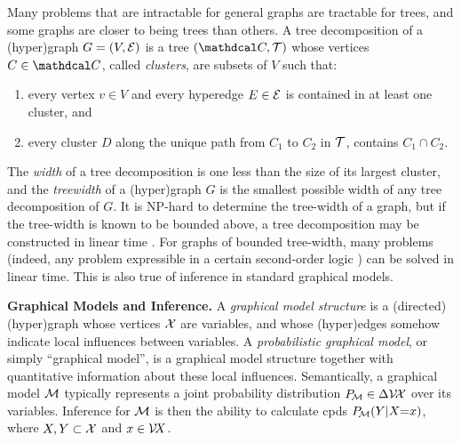 Many problems that are intractable for general graphs
are tractable for trees, and
some graphs are closer to being trees than others.
A tree decomposition of a (hyper)graph $G = (V, \Ed)$ is a tree $(\C, \mathcal T)$ whose vertices $C \in \C$, called
\emph{clusters}, are subsets of $V$ such that:

\begin{enumerate}[nosep]
    \item every vertex $v \in V$ and every hyperedge $E \in \Ed$ is contained in at least one cluster, and
        \item every cluster $D$ along the unique path from $C_1$ to $C_2$ in $\cal T$,
         contains $C_1 \cap C_2$.
\end{enumerate}

The \emph{width} of a tree decomposition is one less than the size of its largest cluster,
and the \emph{treewidth} of a (hyper)graph $G$ is the smallest possible width of any tree decomposition of $G$.
It is NP-hard to determine the tree-width of a graph, but
if the tree-width is known to be bounded above, a tree decomposition may be constructed in linear time \parencite{bodlaender1993linear}.
For graphs of bounded tree-width, many problems 
(indeed, any problem expressible in a certain second-order logic \parencite{courcelle1990})
can be solved in
linear time.
This is also true of inference in 
standard graphical models.


\textbf{Graphical Models and Inference.}
A \emph{graphical model structure}
is a (directed) (hyper)graph whose vertices $\X$ are variables, and whose (hyper)edges 
somehow
indicate local influences between variables.
A \emph{probabilistic graphical model},
or simply  ``graphical model'',
is a
graphical model structure
together with quantitative information about these local influences.
Semantically,
a graphical model $\cal M$
typically
represents a joint probability distribution $\Pr_{\!\cal M}
 \in \Delta \V\!\X$ over its variables.
Inference for $\cal M$ is then the ability to calculate cpds $\Pr_{\!\cal M}(Y|X{=}x)$,
where $X,Y \subset \X$ and $x \in \V\! X$. 

